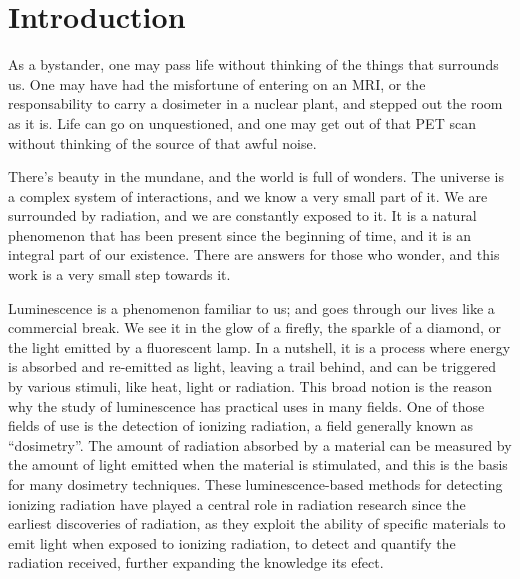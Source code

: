 \chapter{Introduction}



As a bystander, one may pass life without thinking of the things that surrounds us. One may have had the misfortune of entering on an MRI, or the responsability to carry a dosimeter in a nuclear plant, and stepped out the room as it is. Life can go on unquestioned, and one may get out of that PET scan without thinking of the source of that awful noise. 

\vspace{10pt}

There's beauty in the mundane, and the world is full of wonders. The universe is a complex system of interactions, and we know a very small part of it. We are surrounded by radiation, and we are constantly exposed to it. It is a natural phenomenon that has been present since the beginning of time, and it is an integral part of our existence. There are answers for those who wonder, and this work is a very small step towards it.

\vspace{10pt}

Luminescence is a phenomenon familiar to us; and goes through our lives like a commercial break. We see it in the glow of a firefly, the sparkle of a diamond, or the light emitted by a fluorescent lamp. In a nutshell, it is a process where energy is absorbed and re-emitted as light, leaving a trail behind, and can be triggered by various stimuli, like heat, light or radiation. This broad notion is the reason why the study of luminescence has practical uses in many fields. One of those fields of use is the detection of ionizing radiation, a field generally known as ``dosimetry''. The amount of radiation absorbed by a material can be measured by the amount of light emitted when the material is stimulated, and this is the basis for many dosimetry techniques. These luminescence-based methods for detecting ionizing radiation have played a central role in radiation research since the earliest discoveries of radiation, as they exploit the ability of specific materials to emit light when exposed to ionizing radiation, to detect and quantify the radiation received, further expanding the knowledge its efect. 

